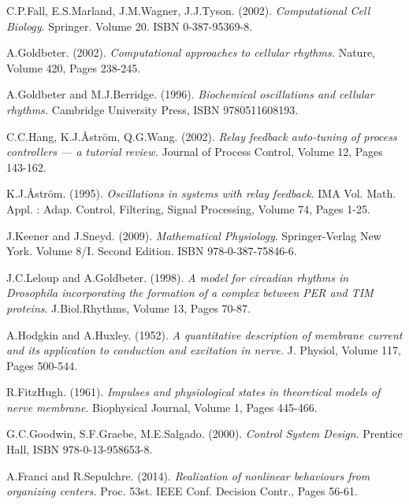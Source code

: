 \documentclass[a4paper, 12pt]{article}
\begin{document}
\begin{thebibliography}{9}


C.P.Fall, E.S.Marland, J.M.Wagner, J.J.Tyson. (2002). \emph{Computational Cell Biology}. Springer. Volume 20. ISBN 0-387-95369-8. 

A.Goldbeter. (2002). \emph{Computational approaches to cellular rhythms.} Nature, Volume 420, Pages 238-245.

A.Goldbeter and M.J.Berridge. (1996). \emph{Biochemical oscillations and cellular rhythms.} Cambridge University Press, ISBN 9780511608193. 

C.C.Hang, K.J.\r{A}str\"{o}m, Q.G.Wang. (2002). \emph{Relay feedback auto-tuning of process controllers --- a tutorial review.} Journal of Process Control, Volume 12, Pages 143-162. 

K.J.\r{A}str\"{o}m. (1995). \emph{Oscillations in systems with relay feedback}. IMA Vol. Math. Appl. : Adap. Control, Filtering, Signal Processing, Volume 74, Pages 1-25. 

J.Keener and J.Sneyd. (2009). \emph{Mathematical Physiology}. Springer-Verlag New York. Volume 8/I. Second Edition. ISBN 978-0-387-75846-6. 

J.C.Leloup and A.Goldbeter. (1998). \emph{A model for circadian rhythms in Drosophila incorporating the formation of a complex between PER and TIM proteins}. J.Biol.Rhythms, Volume 13, Pages 70-87. 

A.Hodgkin and A.Huxley. (1952). \emph{A quantitative description of membrane current and its application to conduction and excitation in nerve.} J. Physiol, Volume 117, Pages 500-544.

R.FitzHugh. (1961). \emph{Impulses and physiological states in theoretical models of nerve membrane}. Biophysical Journal, Volume 1, Pages 445-466.

G.C.Goodwin, S.F.Graebe, M.E.Salgado. (2000). \emph{Control System Design}. Prentice Hall, ISBN 978-0-13-958653-8.

A.Franci and R.Sepulchre. (2014). \emph{Realization of nonlinear behaviours from organizing centers.} Proc. 53st. IEEE Conf. Decision Contr., Pages 56-61.


\end{thebibliography}
\end{document}
